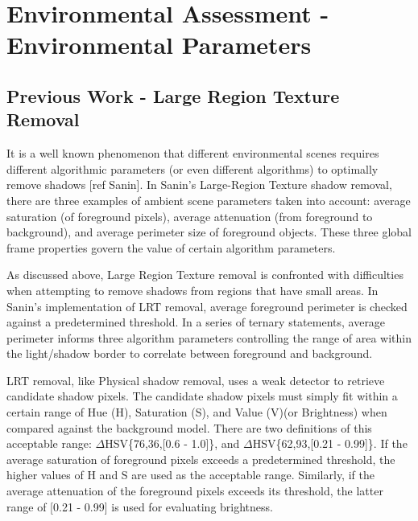 \documentclass[12pt]{report}
\begin{document}
\section{Environmental Assessment - Environmental Parameters} \label{section:envassess}

\subsection{Previous Work - Large Region Texture Removal}

It is a well known phenomenon that different environmental scenes requires different algorithmic parameters (or even different algorithms) to optimally remove shadows [ref Sanin]. In Sanin's Large-Region Texture shadow removal, there are three examples of ambient scene parameters taken into account: average saturation (of foreground pixels), average attenuation (from foreground to background), and average perimeter size of foreground objects. These three global frame properties govern the value of certain algorithm parameters.

As discussed above, Large Region Texture removal is confronted with difficulties when attempting to remove shadows from regions that have small areas. In Sanin's implementation of LRT removal, average foreground perimeter is checked against a predetermined threshold. In a series of ternary statements, average perimeter informs three algorithm parameters controlling the range of area within the light/shadow border to correlate between foreground and background.

LRT removal, like Physical shadow removal, uses a weak detector to retrieve candidate shadow pixels. The candidate shadow pixels must simply fit within a certain range of Hue (H), Saturation (S), and Value (V)(or Brightness) when compared against the background model. There are two definitions of this acceptable range: $\Delta$HSV\{76,36,[0.6 - 1.0]\}, and $\Delta$HSV\{62,93,[0.21 - 0.99]\}. If the average saturation of foreground pixels exceeds a predetermined threshold, the higher values of H and S are used as the acceptable range. Similarly, if the average attenuation of the foreground pixels exceeds its threshold, the latter range of [0.21 - 0.99] is used for evaluating brightness. 
\end{document}
